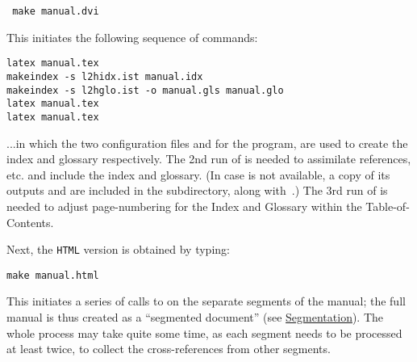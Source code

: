 \begin{itemize}
\begin{small}
\texttt{ make manual.dvi}
\end{small}

\noindent
This initiates the following sequence of commands:
\begin{small}
\begin{verbatim}
latex manual.tex
makeindex -s l2hidx.ist manual.idx
makeindex -s l2hglo.ist -o manual.gls manual.glo
latex manual.tex
latex manual.tex
\end{verbatim}
\end{small}
%
%
...in which the two configuration files  and  
for the  program, are used to create the index and glossary respectively.
The 2nd run of  is needed to assimilate references, etc.
and include the index and glossary.\html{\\}%
%
\html{\\}
(In case  is not available, a copy of its outputs  
and  are included in the  subdirectory, 
along with \,.)\html{\\}
The 3rd run of  is needed to adjust page-numbering for the Index 
and Glossary within the Table-of-Contents.

\noindent
Next, the \texttt{HTML} version is obtained by typing:

\begin{small}
\texttt{make manual.html}
\end{small}

\noindent
This initiates a series of calls to \latextohtml{} on the separate
segments of the manual; 
the full manual is thus created as a ``segmented document''
(see \hyperref{a later section}{Section~}{}{Segmentation}).
The whole process may take quite some time, 
as each segment needs to be processed at least twice, 
to collect the cross-references from other segments.


\end{itemize}
